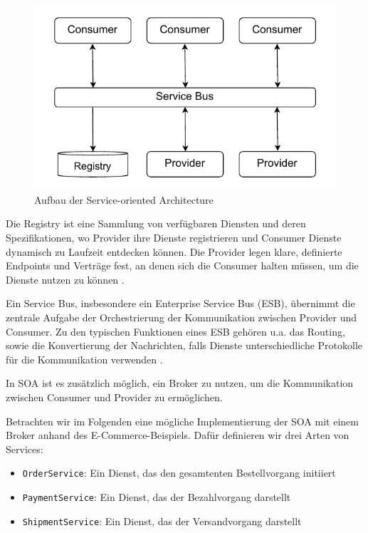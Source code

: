 \documentclass[acmtog]{acmart}
\begin{document}
\begin{figure}[!h]
  \centering
  \includegraphics[width=0.8\linewidth]{images/soa/soa.pdf}
  \caption{Aufbau der Service-oriented Architecture}
  \label{fig:soa}
\end{figure}

Die Registry ist eine Sammlung von verfügbaren Diensten und deren Spezifikationen, wo
Provider ihre Dienste registrieren und Consumer Dienste dynamisch zu Laufzeit entdecken können.
Die Provider legen klare, definierte Endpoints und Verträge fest, an denen sich die Consumer
halten müssen, um die Dienste nutzen zu können \cite[23 - 24]{soa4}.

Ein Service Bus, insbesondere ein Enterprise Service Bus (ESB), übernimmt die zentrale
Aufgabe der Orchestrierung der Kommunikation zwischen Provider und Consumer.
Zu den typischen Funktionen eines ESB gehören u.a. das Routing, sowie die
Konvertierung der Nachrichten, falls Dienste unterschiedliche Protokolle für die Kommunikation verwenden \cite[37]{soa4}.

In SOA ist es zusätzlich möglich, ein Broker zu nutzen, um die Kommunikation zwischen
Consumer und Provider zu ermöglichen.\cite[2]{soa5}

Betrachten wir im Folgenden eine mögliche Implementierung der SOA mit einem Broker anhand des E-Commerce-Beispiels.
Dafür definieren wir drei Arten von Services:
\begin{itemize}
  \item \texttt{OrderService}: Ein Dienst, das den gesamtenten Bestellvorgang initiiert
  \item \texttt{PaymentService}: Ein Dienst, das der Bezahlvorgang darstellt
  \item \texttt{ShipmentService}: Ein Dienst, das der Versandvorgang darstellt
\end{itemize}
\end{document}

